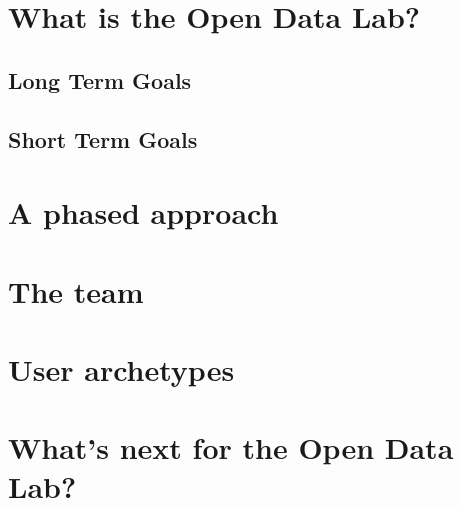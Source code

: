 \section{What is the Open Data Lab?}
\subsection{Long Term Goals}
\subsection{Short Term Goals}
\section{A phased approach}
\section{The team}
\section{User archetypes}
\section{What's next for the Open Data Lab?}
